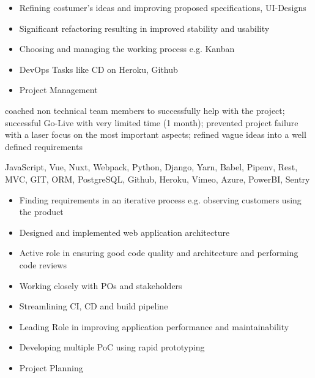 \documentclass[9pt,a4paper]{altacv}
\begin{document}
%

\begin{itemize}
\item Refining costumer's ideas and improving proposed specifications, UI-Designs
\item Significant refactoring resulting in improved stability and usability
\item Choosing and managing the working process e.g. Kanban
\item DevOps Tasks like CD on Heroku, Github
\item Project Management

\end{itemize}

coached non technical team members to successfully help with the project;
successful Go-Live with very limited time (1 month);
prevented project failure with a laser focus on the most important aspects;
refined vague ideas into a well defined requirements

JavaScript, Vue, Nuxt, Webpack, Python, Django, Yarn, Babel, Pipenv,
Rest, MVC, GIT, ORM, PostgreSQL, Github, Heroku, Vimeo, Azure, PowerBI, Sentry

\divider

%

\begin{itemize}
\item Finding requirements in an iterative process e.g. observing customers using the product
\item Designed and implemented web application architecture
\item Active role in ensuring good code quality and architecture and performing code reviews
\item Working closely with POs and stakeholders
\item Streamlining CI, CD and build pipeline
\item Leading Role in improving application performance and maintainability
\item Developing multiple PoC using rapid prototyping
\item Project Planning

\end{itemize}
\end{document}
